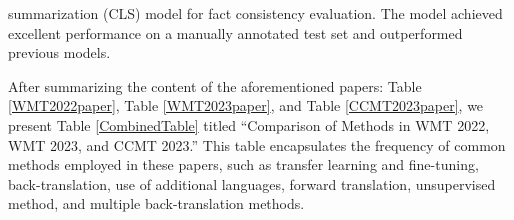 \documentclass[acmsmall]{acmart}
\begin{document}
summarization (CLS) model for fact consistency evaluation. The model achieved excellent performance on a manually annotated test set and outperformed previous models.









After summarizing the content of the aforementioned papers: Table \ref{WMT2022paper}, Table \ref{WMT2023paper}, and Table \ref{CCMT2023paper}, we present Table \ref{CombinedTable} titled ``Comparison of Methods in WMT 2022, WMT 2023, and CCMT 2023.'' This table encapsulates the frequency of common methods employed in these papers, such as transfer learning and fine-tuning, back-translation, use of additional languages, forward translation, unsupervised method, and multiple back-translation methods.


\color{black}
\end{document}
